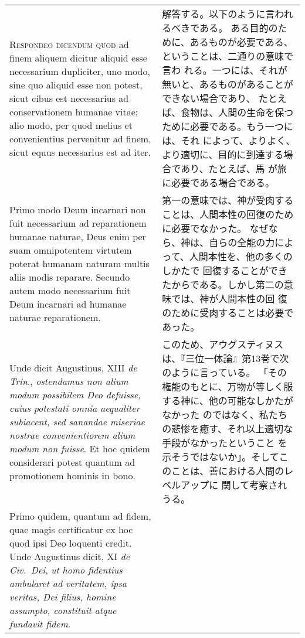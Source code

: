 \documentclass[10pt]{jsarticle} %
\begin{document}
\begin{longtable}{p{21em}p{21em}}
\\

{\scshape Respondeo dicendum quod} ad finem aliquem dicitur aliquid esse
 necessarium dupliciter, uno modo, sine quo aliquid esse non potest,
 sicut cibus est necessarius ad conservationem humanae vitae; alio modo,
 per quod melius et convenientius pervenitur ad finem, sicut equus
 necessarius est ad iter. 

&

解答する。以下のように言われるべきである。
ある目的のために、あるものが必要である、ということは、二通りの意味で言わ
 れる。一つには、それが無いと、あるものがあることができない場合であり、
 たとえば、食物は、人間の生命を保つために必要である。もう一つには、それ
 によって、よりよく、より適切に、目的に到達する場合であり、たとえば、馬
 が旅に必要である場合である。


\\



Primo modo Deum incarnari non fuit necessarium
 ad reparationem humanae naturae, Deus enim per suam omnipotentem
 virtutem poterat humanam naturam multis aliis modis reparare. Secundo
 autem modo necessarium fuit Deum incarnari ad humanae naturae
 reparationem. 

&

第一の意味では、神が受肉することは、人間本性の回復のために必要でなかった。
 なぜなら、神は、自らの全能の力によって、人間本性を、他の多くのしかたで
 回復することができたからである。しかし第二の意味では、神が人間本性の回
 復のために受肉することは必要であった。


\\


Unde dicit Augustinus, XIII {\itshape de Trin}., {\itshape ostendamus non
 alium modum possibilem Deo defuisse, cuius potestati omnia aequaliter
 subiacent, sed sanandae miseriae nostrae convenientiorem alium modum
 non fuisse}. Et hoc quidem considerari potest quantum ad promotionem
 hominis in bono. 


&

このため、アウグスティヌスは、『三位一体論』第13巻で次のように言っている。
 「その権能のもとに、万物が等しく服する神に、他の可能なしかたがなかった
 のではなく、私たちの悲惨を癒す、それ以上適切な手段がなかったということ
 を示そうではないか」。そしてこのことは、善における人間のレベルアップに
 関して考察されうる。


\\


Primo quidem, quantum ad fidem, quae magis
 certificatur ex hoc quod ipsi Deo loquenti credit. Unde Augustinus
 dicit, XI {\itshape de Civ.~Dei}, {\itshape ut homo fidentius ambularet ad veritatem, ipsa
 veritas, Dei filius, homine assumpto, constituit atque fundavit
 fidem}. 



\end{longtable}
\end{document}
